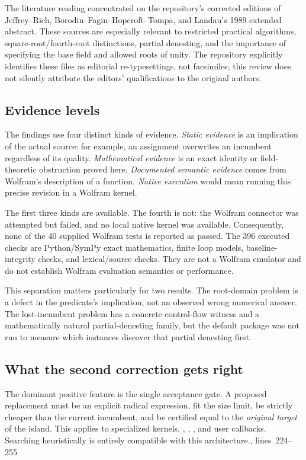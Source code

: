 \documentclass[11pt,a4paper]{article}
\newcommand{\code}[1]{\texttt{\detokenize{#1}}}
\newcommand{\src}[1]{\cite{source}, lines~#1}
\theoremstyle{definition}\newtheorem{definition}[proposition]{Definition}
\theoremstyle{remark}\newtheorem{remark}[proposition]{Remark}
\begin{document}
The literature reading concentrated on the repository's corrected editions of
Jeffrey--Rich, Borodin--Fagin--Hopcroft--Tompa, and Landau's 1989 extended
abstract. These sources are especially relevant to restricted practical
algorithms, square-root/fourth-root distinctions, partial denesting, and the
importance of specifying the base field and allowed roots of unity. The
repository explicitly identifies these files as editorial re-typesettings,
not facsimiles; this review does not silently attribute the editors'
qualifications to the original authors.\cite{jeffrey,bfht,landau,editions}

\subsection{Evidence levels}
The findings use four distinct kinds of evidence. \emph{Static evidence} is an
implication of the actual source: for example, an assignment overwrites an
incumbent regardless of its quality. \emph{Mathematical evidence} is an exact
identity or field-theoretic obstruction proved here. \emph{Documented semantic
evidence} comes from Wolfram's description of a function. \emph{Native execution}
would mean running this precise revision in a Wolfram kernel.

The first three kinds are available. The fourth is not: the Wolfram connector
was attempted but failed, and no local native kernel was available. Consequently,
none of the 40 supplied Wolfram tests is reported as passed. The 396 executed
checks are Python/SymPy exact mathematics, finite loop models, baseline-integrity
checks, and lexical/source checks. They are not a Wolfram emulator and do not
establish Wolfram evaluation semantics or performance.

This separation matters particularly for two results. The root-domain problem
is a defect in the predicate's implication, not an observed wrong numerical
answer. The lost-incumbent problem has a concrete control-flow witness and a
mathematically natural partial-denesting family, but the default package was
not run to measure which instances discover that partial denesting first.

\subsection{What the second correction gets right}
The dominant positive feature is the single acceptance gate. A proposed
replacement must be an explicit radical expression, fit the size limit, be
strictly cheaper than the current incumbent, and be certified equal to the
\emph{original target} of the island. This applies to specialized kernels,
\code{Simplify}, \code{Factor}, \code{ToRadicals}, and user callbacks. Searching
heuristically is entirely compatible with this architecture.\src{224--255}
\end{document}
